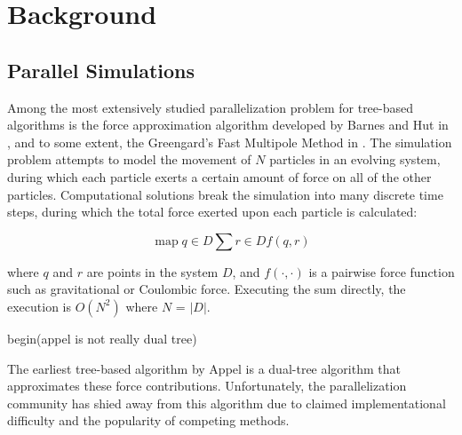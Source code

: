 \documentclass[times, 10pt,twocolumn]{article}
\DeclareMathOperator*{\map}{map}
\begin{document}
%
%
%
%
%
%
%
%

\section{Background}

\subsection{Parallel \nbody Simulations}

Among the most extensively studied parallelization problem for tree-based algorithms is the \nbody force approximation algorithm developed by Barnes and Hut in \cite{barneshut}, and to some extent, the Greengard's Fast Multipole Method in \cite{fmm}.
The \nbody simulation problem attempts to model the movement of $N$ particles in an evolving system, during which each particle exerts a certain amount of force on all of the other particles.
Computational solutions break the simulation into many discrete time steps, during which the total force exerted upon each particle is calculated:

 $$\map{q \in D} \sum{r \in D} f(q, r)$$

\noindent where $q$ and $r$ are points in the system $D$, and $f(\cdot, \cdot)$ is a pairwise force function such as gravitational or Coulombic force.
Executing the sum directly, the execution is $O(N^2)$ where $N$ = $|D|$.

begin(appel is not really dual tree)

The earliest tree-based algorithm by Appel \cite{appel} is a dual-tree algorithm that approximates these force contributions.
Unfortunately, the parallelization community has shied away from this algorithm due to claimed implementational difficulty and the popularity of competing methods.
\end{document}
